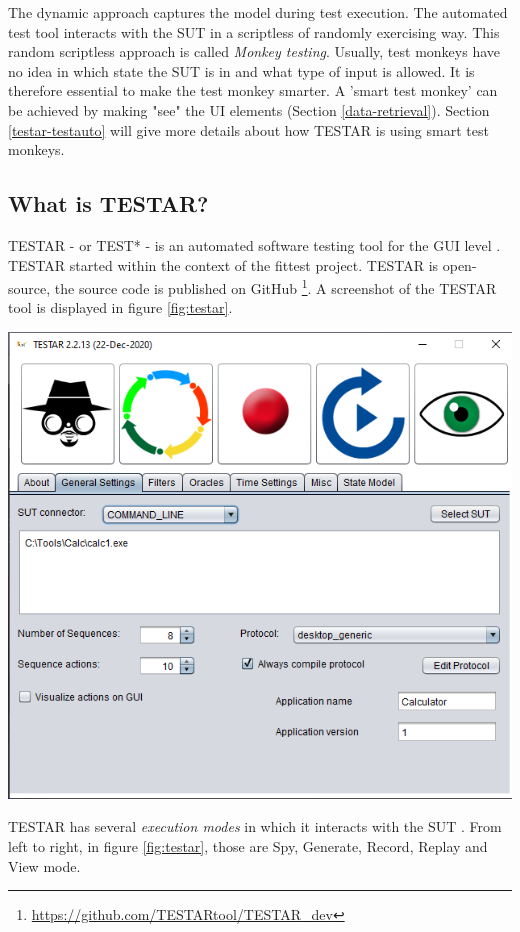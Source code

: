 The dynamic approach captures the model during test execution. The automated test tool interacts with the SUT in a scriptless of randomly exercising way. This random scriptless approach is called \emph{Monkey testing}. Usually, test monkeys have no idea in which state the SUT is in and what type of input is allowed. It is therefore essential to make the test monkey smarter. A 'smart test monkey' can be achieved by making "see" the UI elements (Section \ref{data-retrieval}). Section \ref{testar-testauto} will give more details about how TESTAR is using smart test monkeys.


\subsection{What is TESTAR?}
TESTAR - or TEST* - is an automated software testing tool for the GUI level \cite{testar-about}. TESTAR started within the context of the \acrfull{fittest} project. TESTAR is open-source, the source code is published on GitHub \footnote{ \url{https://github.com/TESTARtool/TESTAR\_dev}}. A screenshot of the TESTAR tool is displayed in figure \ref{fig:testar}.

\begingroup
\captionsetup{type=figure}
\includegraphics[scale=0.5]{pics/testar.png}
\label{fig:testar}
\endgroup

TESTAR has several \emph{execution modes} in which it interacts with the SUT \cite{testar-manual}. From left to right, in figure \ref{fig:testar}, those are Spy, Generate, Record, Replay and View mode. 

